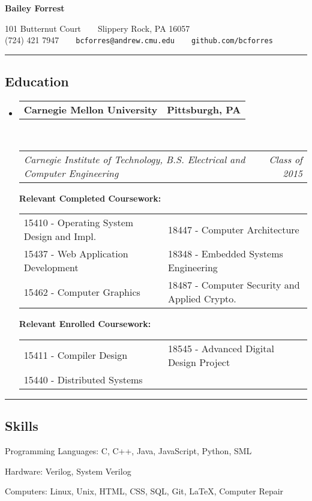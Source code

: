 \documentclass[10pt, letterpaper]{article}
\makeatletter
\newcommand{\titleTopOffset}{-1.0em} %
\newcommand{\titleBotOffset}{-0.4em} %
\newenvironment{indentsection}[1]%
{\begin{list}{}
    {\setlength{\leftmargin}{#1}}
    \item[]
}
{\end{list}}
\newcommand{\headerrow}[2]
{\begin{tabular*}{\linewidth}{l@{\extracolsep{\fill}}r}
    #1 & #2 \\
\end{tabular*}}
\newcommand{\sectionheader}[1]
{\hrule
\vspace{\titleTopOffset}
\subsection*{#1}
\vspace{\titleBotOffset}}
\makeatother
\begin{document}
\begin{center}
{\LARGE \textbf{Bailey Forrest}}

101 Butternut Court\ \ \textbullet \ \ Slippery Rock, PA 16057 \\
(724) 421 7947\ \ \textbullet \ \ \texttt{bcforres@andrew.cmu.edu}\ \ \textbullet \ \ \texttt{github.com/bcforres}
\end{center}

\sectionheader{Education}
\begin{itemize}
    \item
        \headerrow
            {\textbf{Carnegie Mellon University}}
            {\textbf{Pittsburgh, PA}}
        \\
        \headerrow
            {\emph{Carnegie Institute of Technology, B.S. Electrical and Computer Engineering}}
            {\emph{Class of 2015}}


        \smallskip
        \textbf{Relevant Completed Coursework:}

        \begin{tabular*}{\linewidth}{p{0.5\linewidth}  p{0.5\linewidth}}
            15410 - Operating System Design and Impl. & 18447 - Computer Architecture \\
            15437 - Web Application Development & 18348 - Embedded Systems Engineering \\
            15462 - Computer Graphics & 18487 - Computer Security and Applied Crypto. \\
        \end{tabular*}


        \smallskip
        \textbf{Relevant Enrolled Coursework:}

        \begin{tabular*}{\linewidth}{p{0.5\linewidth}  p{0.5\linewidth}}
            15411 - Compiler Design & 18545 - Advanced Digital Design Project \\
            15440 - Distributed Systems & \\
        \end{tabular*}

\end{itemize}


\sectionheader{Skills}
\begin{indentsection}{\parindent}
    \begin{description*}
        \item[Programming Languages:]
            C, C++, Java, JavaScript, Python, SML

        \item[Hardware:]
            Verilog, System Verilog

        \item[Computers:]
            Linux, Unix, HTML, CSS, SQL, Git, \LaTeX, Computer Repair

    \end{description*}
\end{indentsection}
\end{document}
